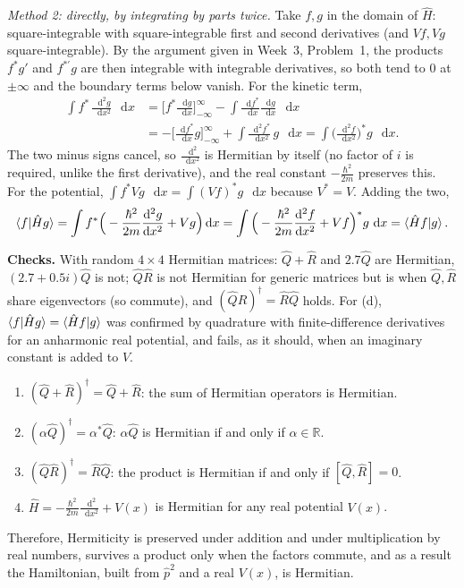 \documentclass[12pt]{article}
\renewcommand{\d}{\mathop{}\!\mathrm{d}}
\begin{document}
\begin{solutionbox}
\emph{Method 2: directly, by integrating by parts twice.} Take $f,g$ in the domain of $\hat H$: square-integrable with square-integrable first and second derivatives (and $Vf,Vg$ square-integrable). By the argument given in Week~3, Problem~1, the products $f^*g'$ and $f^{*\prime}g$ are then integrable with integrable derivatives, so both tend to $0$ at $\pm\infty$ and the boundary terms below vanish. For the kinetic term,
\begin{align*}
\int f^*\,\frac{\d^2g}{\d x^2}\,\d x
&=\Big[f^*\frac{\d g}{\d x}\Big]_{-\infty}^{\infty}-\int\frac{\d f^*}{\d x}\frac{\d g}{\d x}\,\d x\\
&=-\Big[\frac{\d f^*}{\d x}g\Big]_{-\infty}^{\infty}+\int\frac{\d^2f^*}{\d x^2}\,g\,\d x
=\int\Big(\frac{\d^2f}{\d x^2}\Big)^*g\,\d x .
\end{align*}
The two minus signs cancel, so $\frac{\d^2}{\d x^2}$ is Hermitian by itself (no factor of $i$ is required, unlike the first derivative), and the real constant $-\frac{\hbar^2}{2m}$ preserves this. For the potential, $\int f^*Vg\,\d x=\int(Vf)^*g\,\d x$ because $V^*=V$. Adding the two,
\[
\braket{f|\hat Hg}=\int f^*\Big(-\frac{\hbar^2}{2m}\frac{\d^2g}{\d x^2}+Vg\Big)\d x=\int\Big(-\frac{\hbar^2}{2m}\frac{\d^2f}{\d x^2}+Vf\Big)^*g\,\d x=\braket{\hat Hf|g}.
\]

\textbf{Checks.} With random $4\times4$ Hermitian matrices: $\hat Q+\hat R$ and $2.7\hat Q$ are Hermitian, $(2.7+0.5i)\hat Q$ is not; $\hat Q\hat R$ is not Hermitian for generic matrices but is when $\hat Q,\hat R$ share eigenvectors (so commute), and $(\hat Q\hat R)^\dagger=\hat R\hat Q$ holds. For (d), $\braket{f|\hat Hg}=\braket{\hat Hf|g}$ was confirmed by quadrature with finite-difference derivatives for an anharmonic real potential, and fails, as it should, when an imaginary constant is added to $V$.
\end{solutionbox}

\begin{answerbox}
\begin{enumerate}[label=(\alph*)]
\item $(\hat Q+\hat R)^\dagger=\hat Q+\hat R$: the sum of Hermitian operators is Hermitian.
\item $(\alpha\hat Q)^\dagger=\alpha^*\hat Q$: $\alpha\hat Q$ is Hermitian if and only if $\alpha\in\mathbb R$.
\item $(\hat Q\hat R)^\dagger=\hat R\hat Q$: the product is Hermitian if and only if $[\hat Q,\hat R]=0$.
\item $\hat H=-\frac{\hbar^2}{2m}\frac{\d^2}{\d x^2}+V(x)$ is Hermitian for any real potential $V(x)$.
\end{enumerate}
Therefore, Hermiticity is preserved under addition and under multiplication by real numbers, survives a product only when the factors commute, and as a result the Hamiltonian, built from $\hat p^2$ and a real $V(x)$, is Hermitian.
\end{answerbox}
\end{document}

